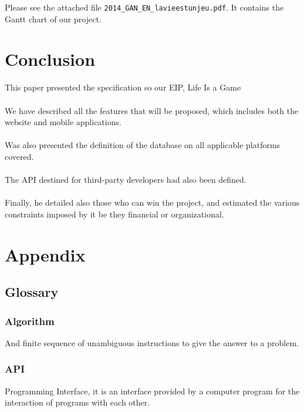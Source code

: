 \documentclass{life-fr}
\begin{document}
Please see the attached file \texttt {2014\_GAN\_EN\_lavieestunjeu.pdf}. It contains the Gantt chart of our project.


\newpage
\hspace{2cm}
\newpage


\chapter{Conclusion}

This paper presented the specification so our EIP, Life Is a Game \\
\\
We have described all the features that will be proposed, which includes both the website and mobile applications.\\
\\
Was also presented the definition of the database on all applicable platforms covered.\\
\\
The API destined for third-party developers had also been defined.\\
\\
Finally, he detailed also those who can win the project, and estimated the various constraints imposed by it be they financial or organizational.\\

\newpage
\hspace{2cm}
\newpage

\chapter {Appendix}

\section {Glossary}

\subsection {Algorithm}

And finite sequence of unambiguous instructions to give the answer to a problem.

\subsection {API}

Programming Interface, it is an interface provided by a computer program for the interaction of programs with each other.
\end{document}
